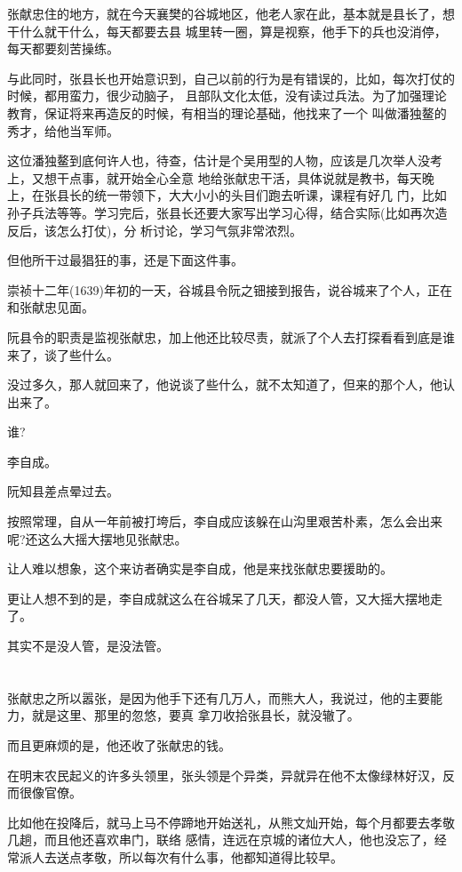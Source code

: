 \documentclass[11pt,a4paper,onecolumn]{article}
\begin{document}
张献忠住的地方，就在今天襄樊的谷城地区，他老人家在此，基本就是县长了，想干什么就干什么，每天都要去县
城里转一圈，算是视察，他手下的兵也没消停，每天都要刻苦操练。

与此同时，张县长也开始意识到，自己以前的行为是有错误的，比如，每次打仗的时候，都用蛮力，很少动脑子，
且部队文化太低，没有读过兵法。为了加强理论教育，保证将来再造反的时候，有相当的理论基础，他找来了一个
叫做潘独鳌的秀才，给他当军师。

这位潘独鳌到底何许人也，待查，估计是个吴用型的人物，应该是几次举人没考上，又想干点事，就开始全心全意
地给张献忠干活，具体说就是教书，每天晚上，在张县长的统一带领下，大大小小的头目们跑去听课，课程有好几
门，比如孙子兵法等等。学习完后，张县长还要大家写出学习心得，结合实际(比如再次造反后，该怎么打仗)，分
析讨论，学习气氛非常浓烈。

但他所干过最猖狂的事，还是下面这件事。

崇祯十二年(1639)年初的一天，谷城县令阮之钿接到报告，说谷城来了个人，正在和张献忠见面。

阮县令的职责是监视张献忠，加上他还比较尽责，就派了个人去打探看看到底是谁来了，谈了些什么。

没过多久，那人就回来了，他说谈了些什么，就不太知道了，但来的那个人，他认出来了。

谁?

李自成。

阮知县差点晕过去。

按照常理，自从一年前被打垮后，李自成应该躲在山沟里艰苦朴素，怎么会出来呢?还这么大摇大摆地见张献忠。

让人难以想象，这个来访者确实是李自成，他是来找张献忠要援助的。

更让人想不到的是，李自成就这么在谷城呆了几天，都没人管，又大摇大摆地走了。

其实不是没人管，是没法管。

\section[\thesection]{}

张献忠之所以嚣张，是因为他手下还有几万人，而熊大人，我说过，他的主要能力，就是这里、那里的忽悠，要真
拿刀收拾张县长，就没辙了。

而且更麻烦的是，他还收了张献忠的钱。

在明末农民起义的许多头领里，张头领是个异类，异就异在他不太像绿林好汉，反而很像官僚。

比如他在投降后，就马上马不停蹄地开始送礼，从熊文灿开始，每个月都要去孝敬几趟，而且他还喜欢串门，联络
感情，连远在京城的诸位大人，他也没忘了，经常派人去送点孝敬，所以每次有什么事，他都知道得比较早。
\end{document}
